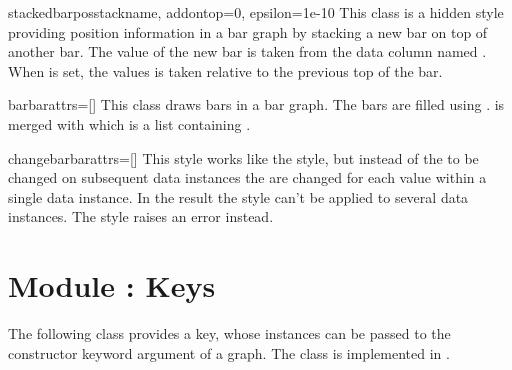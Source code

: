 \begin{classdesc}{stackedbarpos}{stackname, addontop=0, epsilon=1e-10} %
  This class is a hidden style providing position information in a bar
  graph by stacking a new bar on top of another bar. The value of the
  new bar is taken from the data column named . When
   is set, the values is taken relative to the previous
  top of the bar.
\end{classdesc} %

\begin{classdesc}{bar}{barattrs=[]} %
  This class draws bars in a bar graph. The bars are filled using
  .  is merged with 
  which is a list containing .
\end{classdesc} %

\begin{classdesc}{changebar}{barattrs=[]} %
  This style works like the  style, but instead of the
   to be changed on subsequent data instances the
   are changed for each value within a single data
  instance. In the result the style can't be applied to several data
  instances. The style raises an error instead.
\end{classdesc} %

\section{Module : Keys} %
\label{graph:key}


The following class provides a key, whose instances can be passed to
the constructor keyword argument  of a graph. The class is
implemented in .

